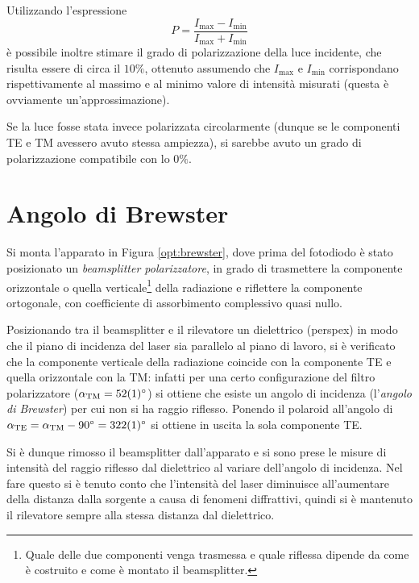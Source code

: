 \documentclass[10pt,oneside,a4paper]{article}
\begin{document}
\begin{multicols}{2}
Utilizzando l'espressione
\[
P = \frac{I_\text{max} - I_\text{min}}{I_\text{max} + I_\text{min}}
\]
è possibile inoltre stimare il grado di polarizzazione della luce incidente, che risulta essere di circa il $10\%$, ottenuto assumendo che $I_\mathrm{max}$ e $I_\mathrm{min}$ corrispondano rispettivamente al massimo e al minimo valore di intensità misurati (questa è ovviamente un'approssimazione).

Se la luce fosse stata invece polarizzata circolarmente (dunque se le componenti TE e TM avessero avuto stessa ampiezza), si sarebbe avuto un grado di polarizzazione compatibile con lo $0\%$.


\section{Angolo di Brewster}
Si monta l'apparato in Figura \ref{opt:brewster}, dove prima del fotodiodo è stato posizionato un \emph{beamsplitter polarizzatore}, in grado di trasmettere la componente orizzontale o quella verticale\footnote{Quale delle due componenti venga trasmessa e quale riflessa dipende da come è costruito e come è montato il beamsplitter.} della radiazione e riflettere la componente ortogonale, con coefficiente di assorbimento complessivo quasi nullo. 

Posizionando tra il beamsplitter e il rilevatore un dielettrico (perspex) in modo che il piano di incidenza del laser sia parallelo al piano di lavoro, si è verificato che la componente verticale della radiazione coincide con la componente TE e quella orizzontale con la TM: infatti per una certo configurazione del filtro polarizzatore ($\alpha_\text{TM} = \SI{52 \pm 1}{\degree}$) si ottiene che esiste un angolo di incidenza (l'\emph{angolo di Brewster}) per cui non si ha raggio riflesso. Ponendo il polaroid  all'angolo di $\alpha_\text{TE} = \alpha_\text{TM} - \SI{90}{\degree} = \SI{322 \pm 1}{\degree}$ si ottiene in uscita la sola componente TE.

Si è dunque rimosso il beamsplitter dall'apparato e si sono prese le misure di intensità del raggio riflesso dal dielettrico al variare dell'angolo di incidenza. Nel fare questo si è tenuto conto che l'intensità del laser diminuisce all'aumentare della distanza dalla sorgente a causa di fenomeni diffrattivi, quindi si è mantenuto il rilevatore sempre alla stessa distanza dal dielettrico.


\end{multicols}
\end{document}
